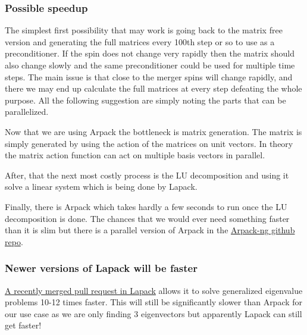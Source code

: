 \documentclass[%
 reprint,
 amsmath,amssymb,
 aps,
]{revtex4-2}
\begin{document}
\subsubsection{Possible speedup}

The simplest first possibility that may work is going back to the matrix free version and generating the full matrices every 100th step or so to use as a preconditioner. If the spin does not change very rapidly then the matrix should also change slowly and the same preconditioner could be used for multiple time steps. The main issue is that close to the merger spins will change rapidly, and there we may end up calculate the full matrices at every step defeating the whole purpose. All the following suggestion are simply noting the parts that can be parallelized.


Now that we are using Arpack the bottleneck is matrix generation. The matrix is simply generated by using the action of the matrices on unit vectors. In theory the matrix action function can act on multiple basis vectors in parallel.

After, that the next most costly process is the LU decomposition and using it solve a linear system which is being done by Lapack.

Finally, there is Arpack which takes hardly a few seconds to run once the LU decomposition is done. The chances that we would ever need something faster than it is slim but there is a parallel version of Arpack in the \href{https://github.com/opencollab/arpack-ng/tree/master/PARPACK}{Arpack-ng github repo}.


\subsubsection{Newer versions of Lapack will be faster}
\href{https://github.com/Reference-LAPACK/lapack/pull/421}{A recently merged pull request in Lapack} allows it to solve generalized eigenvalue problems 10-12 times faster. This will still be significantly slower than Arpack for our use case as we are only finding 3 eigenvectors but apparently Lapack can still get faster!


\end{document}
